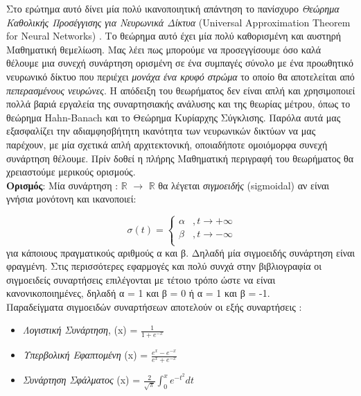 \documentclass[11pt]{article} %
\numberwithin{equation}{subsection}
\begin{document}
Στο ερώτημα αυτό δίνει μία πολύ ικανοποιητική απάντηση το πανίσχυρο \textit{Θεώρημα Καθολικής Προσέγγισης για Νευρωνικά Δίκτυα} (Universal Approximation Theorem for Neural Networks) \cite{uat}. Το θεώρημα αυτό έχει μία πολύ καθορισμένη και αυστηρή Μαθηματική θεμελίωση. Μας λέει πως μπορούμε να προσεγγίσουμε όσο καλά θέλουμε μια συνεχή συνάρτηση ορισμένη σε ένα συμπαγές σύνολο με ένα προωθητικό νευρωνικό δίκτυο που περιέχει \textit{μονάχα ένα κρυφό στρώμα} το οποίο θα αποτελείται από \textit{πεπερασμένους νευρώνες}. Η απόδειξη του θεωρήματος δεν είναι απλή και χρησιμοποιεί πολλά βαριά εργαλεία της συναρτησιακής ανάλυσης και της θεωρίας μέτρου, όπως το θεώρημα Hahn-Banach και το Θεώρημα Κυρίαρχης Σύγκλισης. Παρόλα αυτά μας εξασφαλίζει την αδιαμφησβήτητη ικανότητα των νευρωνικών δικτύων να μας παρέχουν, με μία σχετικά απλή αρχιτεκτονική, οποιαδήποτε ομοιόμορφα συνεχή συνάρτηση θέλουμε. Πρίν δοθεί η πλήρης Μαθηματική περιγραφή του θεωρήματος θα χρειαστούμε μερικούς ορισμούς. \\ 

\textbf{Ορισμός}: Μία συνάρτηση \sigma : $\mathbb{R}$ $\rightarrow$ $\mathbb{R}$ θα λέγεται \textit{σιγμοειδής} (sigmoidal) αν είναι γνήσια μονότονη και ικανοποιεί: 

\[ 
\ \sigma(t) = \left\{
\begin{array}{ll}
      α & , t \rightarrow +\infty \\
      β & , t \rightarrow -\infty \\
\end{array} 
\right. 
\]
για κάποιους πραγματικούς αριθμούς α και β. Δηλαδή μία σιγμοειδής συνάρτηση είναι φραγμένη.  Στις περισσότερες εφαρμογές και πολύ συνχά στην βιβλιογραφία οι σιγμοειδείς συναρτήσεις επιλέγονται με τέτοιο τρόπο ώστε να είναι κανονικοποιημένες, δηλαδή α = 1 και β = 0 ή α = 1 και β = -1. \\

 Παραδείγματα σιγμοειδών συναρτήσεων αποτελούν οι εξής συναρτήσεις : \\
\begin{itemize}
  \item \textit{Λογιστική Συνάρτηση}, \sigma(x) = $\frac{1}{1 + e^{-x}}$ 
  \item \textit{Υπερβολική Εφαπτομένη} \sigma(x) = $\frac{e^x - e^{-x}}{e^x + e^{-x}}$
  \item \textit{Συνάρτηση Σφάλματος} \sigma(x) = $\displaystyle \frac{2}{\sqrt{\pi}} \int_{0}^{x} e^{-t^2} dt$
\end{itemize}
\end{document}
